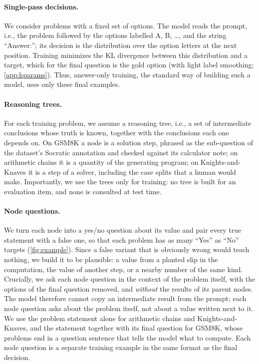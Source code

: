 \documentclass{article}
\begin{document}
\paragraph{Single-pass decisions.} We consider problems with a fixed set of options. The model reads the prompt,
i.e., the problem followed by the options labelled A, B, \ldots, and the string ``Answer:''; its decision is the
distribution over the option letters at the next position. Training minimizes the KL divergence between this
distribution and a target, which for the final question is the gold option (with light label smoothing; \cref{app:hparams}). Thus,
answer-only training, the standard way of building such a model, uses only these final examples.

\paragraph{Reasoning trees.} For each training problem, we assume a reasoning tree, i.e., a set of intermediate
conclusions whose truth is known, together with the conclusions each one depends on. On GSM8K a node is a solution step, phrased
as the sub-question of the dataset's Socratic annotation and checked against its calculator note; on arithmetic
chains it is a quantity of the generating program; on Knights-and-Knaves it is a step of a solver, including the case
splits that a human would make. Importantly, we use the trees only for training: no tree is built for an
evaluation item, and none is consulted at test time.

\paragraph{Node questions.} We turn each node into a yes/no question about its value and pair every true statement
with a false one, so that each problem has as many ``Yes'' as ``No'' targets (\cref{fig:example}). Since a false
variant that is obviously wrong would teach nothing, we build it to be plausible: a value from a planted slip in the computation, the value of another step, or
a nearby number of the same kind. Crucially, we ask each node question in the context of the problem itself, with
the options of the final question removed, and \emph{without} the results of its parent nodes. The model therefore
cannot copy an intermediate result from the prompt; each node question asks about the problem itself, not about a
value written next to it. We use the problem
statement alone for arithmetic chains and Knights-and-Knaves, and the statement together with its final question for
GSM8K, whose problems end in a question sentence that tells the model what to compute. Each node question is a
separate training example in the same format as the final decision.
\end{document}
